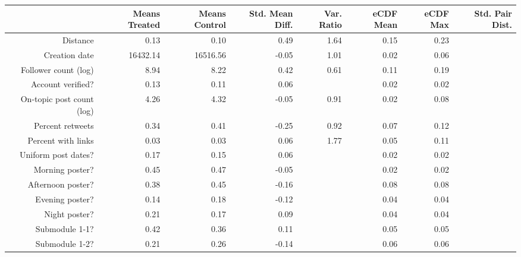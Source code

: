 \begin{table}[ht]
\centering
\begin{tabular}{rrrrrrrr}
  & Means Treated & Means Control & Std. Mean Diff. & Var. Ratio & eCDF Mean & eCDF Max & Std. Pair Dist. \\ 
  \hline
Distance & 0.13 & 0.10 & 0.49 & 1.64 & 0.15 & 0.23 &  \\ 
   \hline
Creation date & 16432.14 & 16516.56 & -0.05 & 1.01 & 0.02 & 0.06 &  \\ 
   \hline
Follower count (log) & 8.94 & 8.22 & 0.42 & 0.61 & 0.11 & 0.19 &  \\ 
   \hline
Account verified? & 0.13 & 0.11 & 0.06 &  & 0.02 & 0.02 &  \\ 
   \hline
On-topic post count (log) & 4.26 & 4.32 & -0.05 & 0.91 & 0.02 & 0.08 &  \\ 
   \hline
Percent retweets & 0.34 & 0.41 & -0.25 & 0.92 & 0.07 & 0.12 &  \\ 
   \hline
Percent with links & 0.03 & 0.03 & 0.06 & 1.77 & 0.05 & 0.11 &  \\ 
   \hline
Uniform post dates? & 0.17 & 0.15 & 0.06 &  & 0.02 & 0.02 &  \\ 
   \hline
Morning poster? & 0.45 & 0.47 & -0.05 &  & 0.02 & 0.02 &  \\ 
   \hline
Afternoon poster? & 0.38 & 0.45 & -0.16 &  & 0.08 & 0.08 &  \\ 
   \hline
Evening poster? & 0.14 & 0.18 & -0.12 &  & 0.04 & 0.04 &  \\ 
   \hline
Night poster? & 0.21 & 0.17 & 0.09 &  & 0.04 & 0.04 &  \\ 
   \hline
Submodule 1-1? & 0.42 & 0.36 & 0.11 &  & 0.05 & 0.05 &  \\ 
   \hline
Submodule 1-2? & 0.21 & 0.26 & -0.14 &  & 0.06 & 0.06 &  \\ 
   \hline
\end{tabular}
\end{table}
